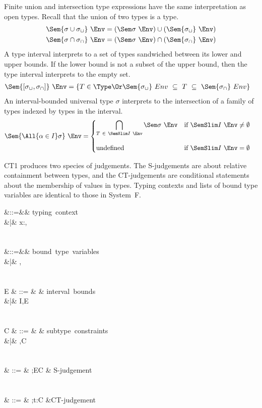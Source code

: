 \documentclass{amsart}
\begin{document}
Finite union and intersection type expressions have the same
interpretation as open types. Recall that the union of two types
is a type.
\begin{align*}
\Sem{\sigma\cup\sigma_\cup}~\Env &= (\Sem\sigma~\Env) \cup
(\Sem{\sigma_\cup}~\Env)\\
\Sem{\sigma\cap\sigma_\cap}~\Env &= (\Sem\sigma~\Env) \cap
(\Sem{\sigma_\cap}~\Env)\\
\end{align*}
A type interval interprets to a set of types sandwiched between
its lower and upper bounds. If the lower bound is not a subset of
the upper bound, then the type interval interprets to the empty
set.
\begin{align*}
\Sem{[\sigma_\cup,\sigma_\cap]}~\Env &= \{T\in\Type\Or
\Sem{\sigma_\cup}~Env\ \subseteq\ T\ \subseteq\ \Sem{\sigma_\cap}~Env\}
\end{align*}
An interval-bounded universal type $\sigma$ interprets to the
intersection of a family of types indexed by types in the
interval.
\begin{align*}
\Sem{\All{\alpha\in I}\sigma}~\Env &=
\begin{cases}
\displaystyle\bigcap_{T\ \in\ \SemSlim I~\Env}
\Sem\sigma~\Env&\text{if }\SemSlim I~\Env\neq\emptyset\\[2em]
\mbox{undefined}&\text{if }\SemSlim I~\Env=\emptyset
\end{cases}
\end{align*}


CT1 produces two species of judgements. The S-judgements are
about relative containment between types, and the CT-judgements
are conditional statements about the membership of values in
types. Typing contexts and lists of bound type variables are
identical to those in System~F.

\begin{syntax}
\Gamma &::=&\emptyset& \mbox{typing context}\\
&|& x:\sigma,\Gamma\\
\\\\
\Delta &::=&\emptyset& \mbox{bound type variables}\\
&|& \alpha,\Delta\\
\\\\
E & ::= & \emptyset & \mbox{interval bounds}\\
&|& \alpha\in I,E\\
\\\\
C & ::= & \emptyset & \mbox{subtype constraints}\\
&|& \sigma\le\sigma,C\\
\\\\
\JS & ::= & \Delta;E\vdash C & \mbox{S-judgement}\\
\\\\
\JCT & ::= & \Gamma;\Delta\vdash t:\sigma\Given C
&\mbox{CT-judgement}
\end{syntax}
\end{document}
